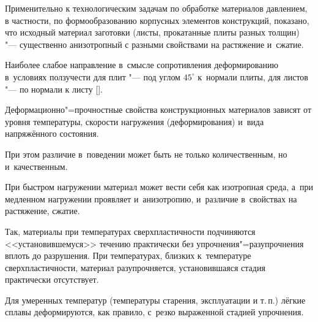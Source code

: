 


\date{04/IX/2009} %









\maketitle




Применительно к технологическим задачам по обработке материалов давлением, в частности, по формообразованию корпусных элементов конструкций, показано, что исходный материал заготовки (листы, прокатанные плиты разных толщин) "--- существенно анизотропный с разными свойствами на растяжение и~сжатие.

Наиболее слабое направление в~смысле сопротивления деформированию в~условиях ползучести для плит "--- под углом $45^{\circ}$ к~нормали плиты, для листов "--- по нормали к листу [].



Деформационно"=прочностные свойства конструкционных материалов зависят от уровня температуры, скорости нагружения (деформирования) и~вида напряжённого состояния.

При этом различие в~поведении может быть не только количественным, но и~качественным.

При быстром нагружении материал может вести себя как изотропная среда, а~при медленном нагружении проявляет и~анизотропию, и~различие в~свойствах на растяжение, сжатие.

Так, материалы при температурах сверхпластичности подчиняются <<установившемуся>> течению практически без упрочнения"=разупрочнения вплоть до разрушения. При температурах, близких к~температуре сверхпластичности, материал разупрочняется, установившаяся стадия практически отсутствует.



Для умеренных температур (температуры старения, эксплуатации и т.\,п.) лёгкие сплавы деформируются, как правило, с~резко выраженной стадией упрочнения.



